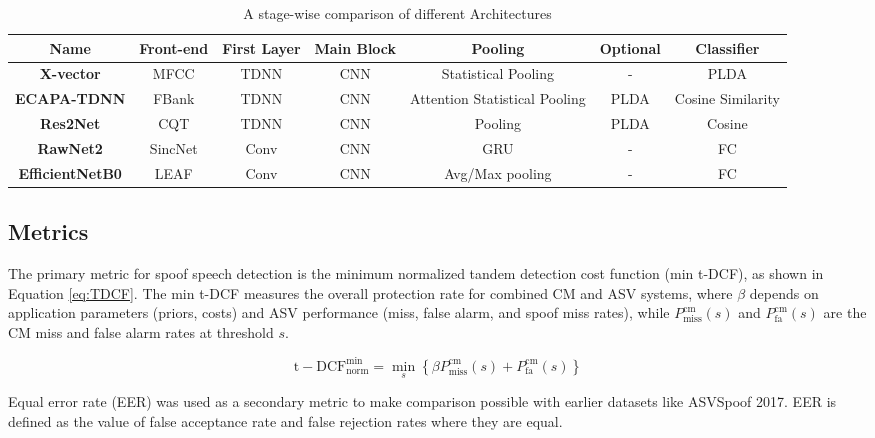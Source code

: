 \documentclass[conference]{IEEEtran}
\begin{document}
\begin{table*}[htb!]
\caption{\label{table:architecture} A stage-wise comparison of different Architectures}
\begin{center}
\begin{tabular}{c|c|c|c|c|c|c}
\hline
\textbf {Name} & \textbf{Front-end} & \textbf{First Layer} & \textbf{Main Block} & \textbf{Pooling} & \textbf{Optional} &\textbf{Classifier} \\
\hline
\textbf {X-vector} & MFCC & TDNN & CNN & Statistical Pooling & - & PLDA \\
\hline
\textbf {ECAPA-TDNN} & FBank & TDNN & CNN & Attention Statistical Pooling & PLDA & Cosine Similarity\\
\hline
\textbf {Res2Net} & CQT & TDNN & CNN & Pooling & PLDA & Cosine \\
\hline
\textbf {RawNet2} & SincNet & Conv & CNN & GRU & - & FC \\
\hline
\textbf {EfficientNetB0} & LEAF & Conv & CNN & Avg/Max pooling & - & FC \\
\hline
\end{tabular}
\end{center}
\end{table*}

\subsection{Metrics}

The primary metric for spoof speech detection is the minimum normalized tandem detection cost function (min t-DCF), as shown in Equation \ref{eq:TDCF}. The min t-DCF measures the overall protection rate for combined CM and ASV systems, where $\beta$ depends on application parameters (priors, costs) and ASV performance (miss, false alarm, and spoof miss rates), while $P_{\mathrm{miss}}^{\mathrm{cm}}(s)$ and $P_{\mathrm{fa}}^{\mathrm{cm}}(s)$ are the CM miss and false alarm rates at threshold $s$\cite{Todisco2019ASVspoof2F}.

\begin{equation}
\mathrm{t-DCF}_{\mathrm{norm}}^{\min }=\min _{s}\left\{\beta P_{\mathrm{miss}}^{\mathrm{cm}}(s)+P_{\mathrm{fa}}^{\mathrm{cm}}(s)\right\}\label{eq:TDCF}
\end{equation}

Equal error rate (EER) was used as a secondary metric to make comparison possible with earlier datasets like ASVSpoof 2017. EER is defined as the value of false acceptance rate and false rejection rates where they are equal.
\end{document}
